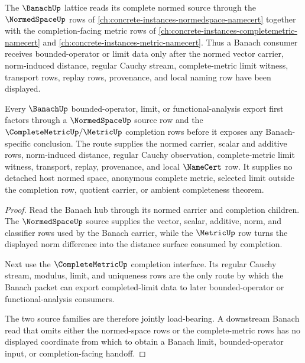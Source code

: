 The $\BanachUp$ lattice reads its complete normed source through the $\NormedSpaceUp$ rows of \autoref{ch:concrete-instances-normedspace-namecert} together with the completion-facing metric rows of \autoref{ch:concrete-instances-completemetric-namecert} and \autoref{ch:concrete-instances-metric-namecert}. Thus a Banach consumer receives bounded-operator or limit data only after the normed vector carrier, norm-induced distance, regular Cauchy stream, complete-metric limit witness, transport rows, replay rows, provenance, and local naming row have been displayed.

\begin{lemma}
\label{lem:banach-normed-complete-metric-lattice-anchor}
Every $\BanachUp$ bounded-operator, limit, or functional-analysis export first factors through a $\NormedSpaceUp$ source row and the $\CompleteMetricUp/\MetricUp$ completion rows before it exposes any Banach-specific conclusion. The route supplies the normed carrier, scalar and additive rows, norm-induced distance, regular Cauchy observation, complete-metric limit witness, transport, replay, provenance, and local $\NameCert$ row. It supplies no detached host normed space, anonymous complete metric, selected limit outside the completion row, quotient carrier, or ambient completeness theorem.
\end{lemma}
\begin{proof}
Read the Banach hub through its normed carrier and completion children. The $\NormedSpaceUp$ source supplies the vector, scalar, additive, norm, and classifier rows used by the Banach carrier, while the $\MetricUp$ row turns the displayed norm difference into the distance surface consumed by completion.

Next use the $\CompleteMetricUp$ completion interface. Its regular Cauchy stream, modulus, limit, and uniqueness rows are the only route by which the Banach packet can export completed-limit data to later bounded-operator or functional-analysis consumers.

The two source families are therefore jointly load-bearing. A downstream Banach read that omits either the normed-space rows or the complete-metric rows has no displayed coordinate from which to obtain a Banach limit, bounded-operator input, or completion-facing handoff.
\end{proof}
